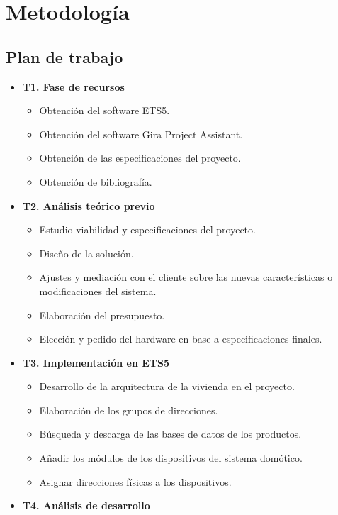 \section{Metodología}
\subsection{Plan de trabajo}

\begin{itemize}
\item \textbf{T1. Fase de recursos}
	\begin{itemize}
	\item Obtención del software ETS5.
	\item Obtención del software Gira Project Assistant.
	\item Obtención de las especificaciones del proyecto.
	\item Obtención de bibliografía. \\
	\end{itemize} 
\item \textbf{T2. Análisis teórico previo}
	\begin{itemize}
	\item Estudio viabilidad y especificaciones del proyecto.
	\item Diseño de la solución.
	\item Ajustes y mediación con el cliente sobre las nuevas características o modificaciones del sistema.
	\item Elaboración del presupuesto.
	\item Elección y pedido del hardware en base a especificaciones finales. \\
	\end{itemize} 
\item \textbf{T3. Implementación en ETS5}
	\begin{itemize}
	\item Desarrollo de la arquitectura de la vivienda en el proyecto.
	\item Elaboración de los grupos de direcciones.
	\item Búsqueda y descarga de las bases de datos de los productos.
	\item Añadir los módulos de los dispositivos del sistema domótico.
	\item Asignar direcciones físicas a los dispositivos. \\
	\end{itemize} 
\item \textbf{T4. Análisis de desarrollo}

\end{itemize}

